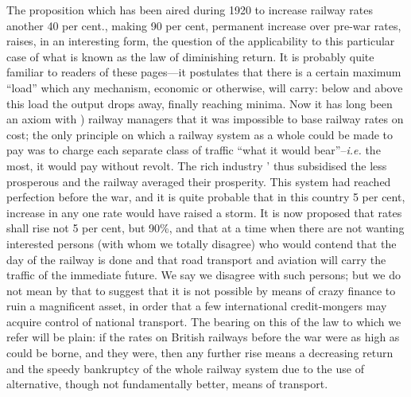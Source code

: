 \documentclass{book}
\begin{document}
The proposition which has been aired during 1920 to increase railway rates another 40 per cent., making 90 per cent, permanent increase over pre-war rates, raises, in an interesting form, the question of the applicability to this particular case of what is known as the law of diminishing return. It is probably quite familiar to readers of these pages—it postulates that there is a certain maximum “load” which any mechanism, economic or otherwise, will carry: below and above this load the output drops away, finally reaching minima. Now it has long been an axiom with ) railway managers that it was impossible to base railway rates on cost; the only principle on which a railway system as a whole could be made to pay was to charge each separate class of traffic “what it would bear”–\emph{i.e.} the most, it would pay without revolt. The rich industry ' thus subsidised the less prosperous and the railway averaged their prosperity. This system had reached perfection before the war, and it is quite probable that in this country 5 per cent, increase in any one rate would have raised a storm. It is now proposed that rates shall rise not 5 per cent, but 90\%, and that at a time when there are not wanting interested persons (with whom we totally disagree) who would contend that the day of the railway is done and that road transport and aviation will carry the traffic of the immediate future. We say we disagree with such persons; but we do not mean by that to suggest that it is not possible by means of crazy finance to ruin a magnificent asset, in order that a few international credit-mongers may acquire control of national transport. The bearing on this of the law to which we refer will be plain: if the rates on British railways before the war were as high as could be borne, and they were, then any further rise means a decreasing return and the speedy bankruptcy of the whole railway system due to the use of alternative, though not fundamentally better, means of transport.
\end{document}
